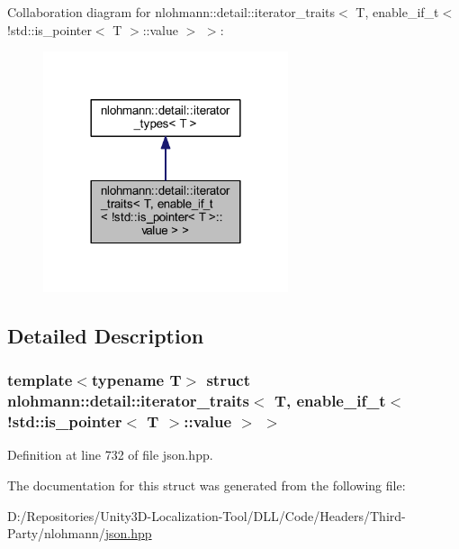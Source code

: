 Collaboration diagram for nlohmann\+::detail\+::iterator\+\_\+traits$<$ T, enable\+\_\+if\+\_\+t$<$ !std\+::is\+\_\+pointer$<$ T $>$\+::value $>$ $>$\+:
\nopagebreak
\begin{figure}[H]
\begin{center}
\leavevmode
\includegraphics[width=204pt]{structnlohmann_1_1detail_1_1iterator__traits_3_01_t_00_01enable__if__t_3_01_9std_1_1is__pointer_1302cf9c02d359663610c9d693381144}
\end{center}
\end{figure}


\subsection{Detailed Description}
\subsubsection*{template$<$typename T$>$\newline
struct nlohmann\+::detail\+::iterator\+\_\+traits$<$ T, enable\+\_\+if\+\_\+t$<$ !std\+::is\+\_\+pointer$<$ T $>$\+::value $>$ $>$}



Definition at line 732 of file json.\+hpp.



The documentation for this struct was generated from the following file\+:\begin{DoxyCompactItemize}
\item 
D\+:/\+Repositories/\+Unity3\+D-\/\+Localization-\/\+Tool/\+D\+L\+L/\+Code/\+Headers/\+Third-\/\+Party/nlohmann/\mbox{\hyperlink{json_8hpp}{json.\+hpp}}\end{DoxyCompactItemize}
